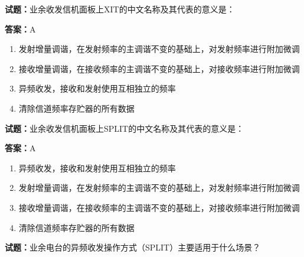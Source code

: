 \documentclass{ctexbook}
\begin{document}




\vspace{1em}

\textbf{试题：}业余收发信机面板上XIT的中文名称及其代表的意义是： 

\textbf{答案：}A 

\begin{enumerate}[leftmargin=3em]
  \item 发射增量调谐，在发射频率的主调谐不变的基础上，对发射频率进行附加微调 

  \item 接收增量调谐，在接收频率的主调谐不变的基础上，对接收频率进行附加微调 

  \item 异频收发，接收和发射使用互相独立的频率 

  \item 清除信道频率存贮器的所有数据 

\end{enumerate}





\vspace{1em}

\textbf{试题：}业余收发信机面板上SPLIT的中文名称及其代表的意义是： 

\textbf{答案：}A 

\begin{enumerate}[leftmargin=3em]
  \item 异频收发，接收和发射使用互相独立的频率 

  \item 发射增量调谐，在发射频率的主调谐不变的基础上，对发射频率进行附加微调 

  \item 接收增量调谐，在接收频率的主调谐不变的基础上，对接收频率进行附加微调 

  \item 清除信道频率存贮器的所有数据 

\end{enumerate}





\vspace{1em}

\textbf{试题：}业余电台的异频收发操作方式（SPLIT）主要适用于什么场景？ 
\end{document}
